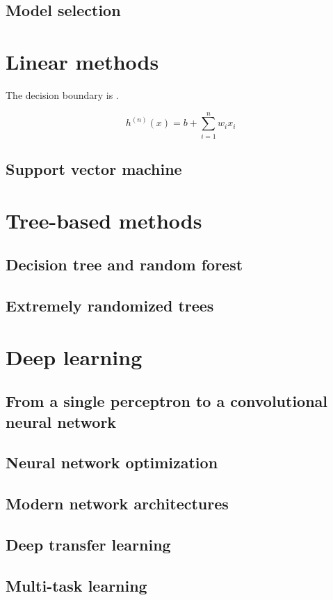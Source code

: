 \subsection{Model selection}

\section{Linear methods}

The decision boundary is . 

\begin{equation}
h^(n)(x) = b + \sum_{i=1}^n w_i x_i 
\end{equation} 

\subsection{Support vector machine}

\section{Tree-based methods}

\subsection{Decision tree and random forest}

\subsection{Extremely randomized trees}

\section{Deep learning}

\subsection{From a single perceptron to a convolutional neural network}

\subsection{Neural network optimization}

\subsection{Modern network architectures}

\subsection{Deep transfer learning}

\subsection{Multi-task learning}

